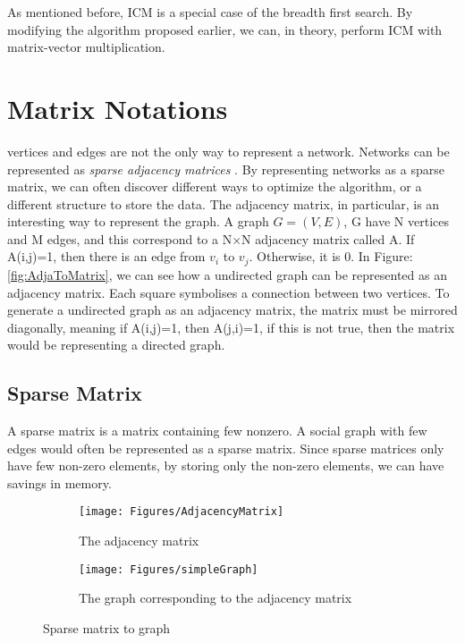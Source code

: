As mentioned before, ICM is a special case of the breadth first search. By modifying the algorithm proposed earlier, we can, in theory, perform ICM with matrix-vector multiplication.  

\section{Matrix Notations}
vertices and edges are not the only way to represent a network. Networks can be represented as \textit{sparse adjacency matrices} \cite{AlgoToMath} \cite{McAndrew1963}. By representing networks as a sparse matrix, we can often discover different ways to optimize the algorithm, or a different structure to store the data. The adjacency matrix, in particular, is an interesting way to represent the graph. A graph $G =(V,E)$, G have N vertices and M edges, and this correspond to a N$\times$N adjacency matrix called A. If A(i,j)=1, then there is an edge from $v_i$ to $v_j$. Otherwise, it is 0. In Figure:\ref{fig:AdjaToMatrix}, we can see how a undirected graph can be represented as an adjacency matrix. Each square symbolises a connection between two vertices. To generate a undirected graph as an adjacency matrix, the matrix must be mirrored diagonally, meaning if A(i,j)=1, then A(j,i)=1, if this is not true, then the matrix would be representing a directed graph.

\subsection{Sparse Matrix}
A sparse matrix is a matrix containing few nonzero. A social graph with few edges would often be represented as a sparse matrix. Since sparse matrices only have few non-zero elements, by storing only the non-zero elements, we can have savings in memory.

\begin{figure}
    \begin{subfigure}{0.5\textwidth}
    \texttt{[image: Figures/AdjacencyMatrix]}
    \caption{The adjacency matrix}
    \label{fig:AdjacencyM}
    \end{subfigure}
    \begin{subfigure}{0.5\textwidth}
    \texttt{[image: Figures/simpleGraph]}
    \caption{The graph corresponding to the adjacency matrix}
    \label{fig:matrix}
    \end{subfigure}
     \caption{Sparse matrix to graph}
     \label{AdjaToMatrix}
\end{figure}

